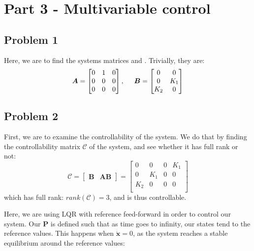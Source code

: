\section{Part 3 - Multivariable control}
\subsection{Problem 1}
Here, we are to find the systems matrices  and . Trivially, they are:
\begin{equation}
  \boldsymbol{A} = \begin{bmatrix}
    0 & 1 & 0 \\
    0 & 0 & 0 \\
    0 & 0 & 0 \\
  \end{bmatrix}, \hspace{0.5cm}
  \boldsymbol{B} = \begin{bmatrix}
    0 & 0 \\
    0 & K_1 \\
    K_2 & 0 \\
  \end{bmatrix}
\end{equation}

\subsection{Problem 2}
First, we are to examine the controllability of the system. We do that by finding the controllability matrix $\boldsymbol{\mathcal{C}}$ of the system, and see whether it has full rank or not:
\begin{equation}
  \boldsymbol{\mathcal{C}} = \begin{bmatrix}
    \boldsymbol{B} & \boldsymbol{AB}
  \end{bmatrix}
  =
  \begin{bmatrix}
    0 & 0 & 0 & K_1 \\
    0 & K_1 & 0 & 0 \\
    K_2 & 0 & 0 & 0 \\
  \end{bmatrix}
\end{equation}
which has full rank: $rank(\boldsymbol{\mathcal{C}}) = 3$, and is thus
controllable.

Here, we are using LQR with reference feed-forward in order to control
our system. Our $\boldsymbol{P}$ is defined such that as time goes to
infinity, our states tend to the reference values. This happens when
$\dot{\boldsymbol{x}} = 0$, as the system reaches a stable equilibrium
around the reference values:


